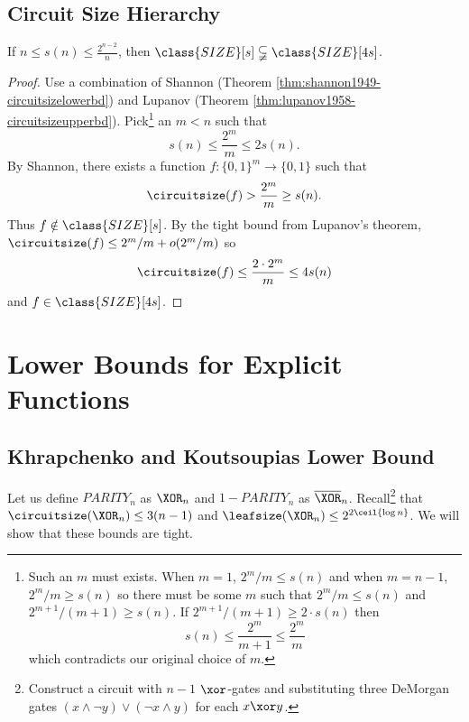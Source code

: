 \subsection{Circuit Size Hierarchy}
\begin{theorem}
	\label{thm:circuitsizehierarchy}
	If $n \leq s(n) \leq \frac{2^{n-2}}{n}$, then $\class{SIZE}[s] \subsetneqq \class{SIZE}[4s]$.
\end{theorem}
\begin{proof}
	Use a combination of Shannon (Theorem \ref{thm:shannon1949-circuitsizelowerbd}) and Lupanov (Theorem \ref{thm:lupanov1958-circuitsizeupperbd}). Pick\footnote{Such an $m$ must exists. When $m = 1$, $2^{m}/m \leq s(n)$ and when $m = n-1$, $2^m/m \geq s(n)$ so there must be some $m$ such that $2^{m}/m \leq s(n)$ and $2^{m+1}/(m+1) \geq s(n)$. If $2^{m+1}/(m+1) \geq 2\cdot s(n)$ then 
	\[s(n) \leq \frac{2^{m}}{m+1} \leq \frac{2^{m}}{m}\]	
	which contradicts our original choice of $m$.} 
	an $m < n$ such that
	\[s(n) \leq \frac{2^m}{m} \leq 2s(n).\]
	By Shannon, there exists a function $f: \{0, 1\}^m \rightarrow \{0,1\}$ such that 
	\[\circuitsize(f) > \frac{2^m}{m} \geq s(n).\]
	Thus $f \notin \class{SIZE}[s]$. By the tight bound from Lupanov's theorem, $\circuitsize(f) \leq 2^m/m + o(2^m/m)$ so 
	\[\circuitsize(f) \leq \frac{2\cdot 2^m}{m} \leq 4s(n)\]
	and $f \in \class{SIZE}[4s]$. 
\end{proof}

\section{Lower Bounds for Explicit Functions}
\subsection{Khrapchenko and Koutsoupias Lower Bound}
Let us define $PARITY_n$ as $\XOR_n$ and $1 - PARITY_n$ as $\overline{\XOR}_n$. Recall\footnote{Construct a circuit with $n-1$ $\xor$-gates and substituting three DeMorgan gates $(x \land \lnot y) \lor (\lnot x \land y)$ for each $x \xor y$.} that $\circuitsize(\XOR_n) \leq 3(n-1)$ and $\leafsize(\XOR_n) \leq 2^{2\ceil{\log n}}$. We will show that these bounds are tight. 

